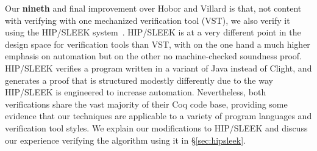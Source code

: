 Our \textbf{nineth} and final improvement over Hobor and Villard is that, not content with verifying  with one mechanized verification tool (VST), we also verify it using the HIP/SLEEK system~\cite{chin:hipsleek}.  HIP/SLEEK is at a very different point in the design space for verification tools than VST, with on the one hand a much higher emphasis on automation but on the other no machine-checked soundness proof.  HIP/SLEEK verifies a  program written in a variant of Java instead of Clight, and generates a proof that is structured modestly differently due to the way HIP/SLEEK is engineered to increase automation.  Nevertheless, both verifications share the vast majority of their Coq code base, providing some evidence that our techniques are applicable to a variety of program languages and verification tool styles.  We explain our modifications to HIP/SLEEK and discuss our experience verifying the  algorithm using it in \S\ref{sec:hipsleek}.


